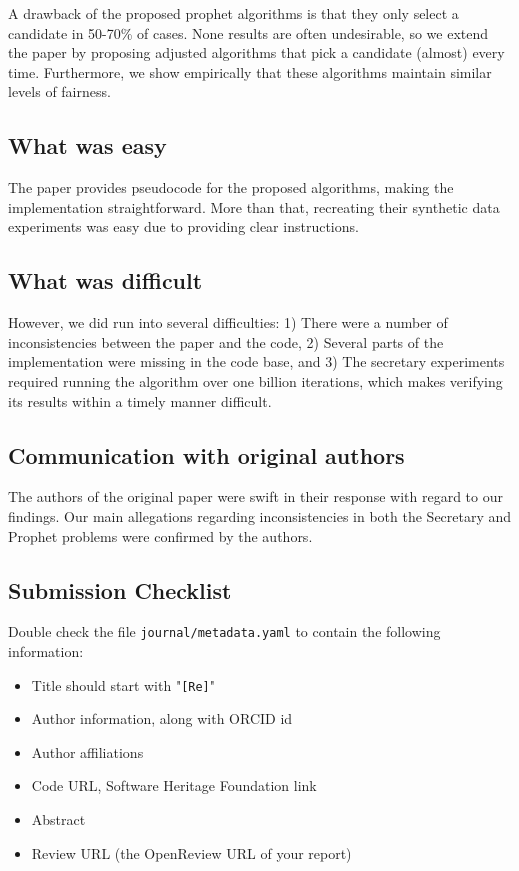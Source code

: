 A drawback of the proposed prophet algorithms is that they only select a candidate in 50-70\% of cases. None results are often undesirable, so we extend the paper by proposing adjusted algorithms that pick a candidate (almost) every time. Furthermore, we show empirically that these algorithms maintain similar levels of fairness.

\subsection*{What was easy}

The paper provides pseudocode for the proposed algorithms, making the implementation straightforward. More than that, recreating their synthetic data experiments was easy due to providing clear instructions.

\subsection*{What was difficult}
However, we did run into several difficulties: 1) There were a number of inconsistencies between the paper and the code, 2) Several parts of the implementation were missing in the code base, and 3) The secretary experiments required running the algorithm over one billion iterations, which makes verifying its results within a timely manner difficult.

\subsection*{Communication with original authors}
The authors of the original paper were swift in their response with regard to our findings. Our main allegations regarding inconsistencies in both the Secretary and Prophet problems were confirmed by the authors. 


\subsection{Submission Checklist}

Double check the file \texttt{journal/metadata.yaml} to contain the following information:

\begin{itemize}
\item Title should start with "\texttt{[Re]}"
\item Author information, along with ORCID id
\item Author affiliations
\item Code URL, Software Heritage Foundation link
\item Abstract
\item Review URL (the OpenReview URL of your report)
\end{itemize}


